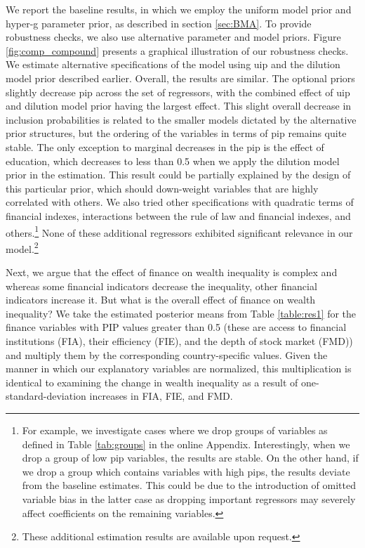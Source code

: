 \documentclass[a4paper,11pt]{article}
\begin{document}
We report the baseline results, in which we employ the uniform model prior and hyper-g parameter prior, as described in section \ref{sec:BMA}. To provide robustness checks, we also use alternative parameter and model priors. Figure \ref{fig:comp_compound} presents a graphical illustration of our robustness checks. We estimate alternative specifications of the model using \ac{uip} and the dilution model prior described earlier. Overall, the results are similar. The optional priors slightly decrease \ac{pip} across the set of regressors, with the combined effect of \ac{uip} and dilution model prior having the largest effect. This slight overall decrease in inclusion probabilities is related to the smaller models dictated by the alternative prior structures, but the ordering of the variables in terms of \ac{pip} remains quite stable. The only exception to marginal decreases in the \ac{pip} is the effect of education, which decreases to less than 0.5 when we apply the dilution model prior in the estimation. This result could be partially explained by the design of this particular prior, which should down-weight variables that are highly correlated with others. We also tried other specifications with quadratic terms of financial indexes, interactions between the rule of law and financial indexes, and others.\footnote{For example, we investigate cases where we drop groups of variables as defined in Table \ref{tab:groups} in the online Appendix. Interestingly, when we drop a group of low \ac{pip} variables, the results are stable. On the other hand, if we drop a group which contains variables with high \ac{pip}s, the results deviate from the baseline estimates. This could be due to the introduction of omitted variable bias in the latter case as dropping important regressors may severely affect coefficients on the remaining variables.} None of these additional regressors exhibited significant relevance in our model.\footnote{These additional estimation results are available upon request.}

Next, we argue that the effect of finance on wealth inequality is complex and whereas some financial indicators decrease the inequality, other financial indicators increase it. But what is the overall effect of finance on wealth inequality? We take the estimated posterior means from Table \ref{table:res1} for the finance variables with PIP values greater than 0.5 (these are access to financial institutions (FIA), their efficiency (FIE), and the depth of stock market (FMD)) and multiply them by the corresponding country-specific values. Given the manner in which our explanatory variables are normalized, this multiplication is identical to examining the change in wealth inequality as a result of one-standard-deviation increases in FIA, FIE, and FMD. 
\end{document}
